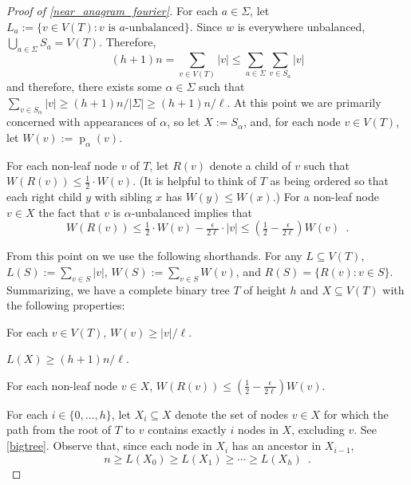 \documentclass{patmorin}
\DeclareMathOperator{\hist}{p}
\begin{document}
\begin{proof}[Proof of \cref{near_anagram_fourier}]
  For each $a\in\Sigma$, let $L_a:=\{v\in V(T): \text{$v$ is $a$-unbalanced}\}$. Since $w$ is everywhere unbalanced, $\bigcup_{a\in\Sigma} S_a=V(T)$. Therefore,
  \[
     (h+1)n = \sum_{v\in V(T)}|v|\le \sum_{a\in\Sigma} \sum_{v\in S_a} |v|
  \]
  and therefore, there exists some $\alpha\in\Sigma$ such that $\sum_{v\in S_{\alpha}}|v|\ge (h+1)n/|\Sigma| \ge (h+1)n/\ell$.   At this point we are primarily concerned with appearances of $\alpha$, so let $X:=S_{\alpha}$, and, for each node $v\in V(T)$, let $W(v):=\hist_{\alpha}(v)$.

  For each non-leaf node $v$ of $T$, let $R(v)$ denote a child of $v$ such that $W(R(v))\le \tfrac12\cdot W(v)$.  (It is helpful to think of $T$ as being ordered so that each right child $y$ with sibling $x$ has $W(y)\le W(x)$.)  For a non-leaf node $v\in X$ the fact that $v$ is $\alpha$-unbalanced implies that
  \[  W(R(v)) \le \tfrac{1}{2}\cdot W(v) - \tfrac{\epsilon}{2\ell}\cdot |v|
      \le (\tfrac12-\tfrac{\epsilon}{2\ell})W(v) \enspace .
  \]

  From this point on we use the following shorthands. For any $L\subseteq V(T)$, $L(S):=\sum_{v\in S}|v|$,
  $W(S):=\sum_{v\in S}W(v)$, and $R(S)=\{R(v):v\in S\}$.  Summarizing, we have a complete binary tree $T$ of height $h$ and
  $X\subseteq V(T)$ with the following properties:
  \begin{compactenum}
    \item For each $v\in V(T)$,  $W(v)\ge |v|/\ell$.
    \item $L(X) \ge (h+1)n/\ell$.
    \item For each non-leaf node $v\in X$,
      $W(R(v)) \le (\tfrac{1}{2}-\tfrac{\epsilon}{2\ell})W(v)$.
  \end{compactenum}
  For each $i\in\{0,\ldots,h\}$, let $X_i\subseteq X$ denote the
  set of nodes $v\in X$ for which the path from the root of $T$ to $v$
  contains exactly $i$ nodes in $X$, excluding $v$.  See \cref{bigtree}. Observe that, since each node in $X_i$ has an ancestor in $X_{i-1}$,
  \[  n \ge L(X_0) \ge L(X_1) \ge \cdots\ge L(X_{h}) \enspace . \]


\end{proof}
\end{document}
